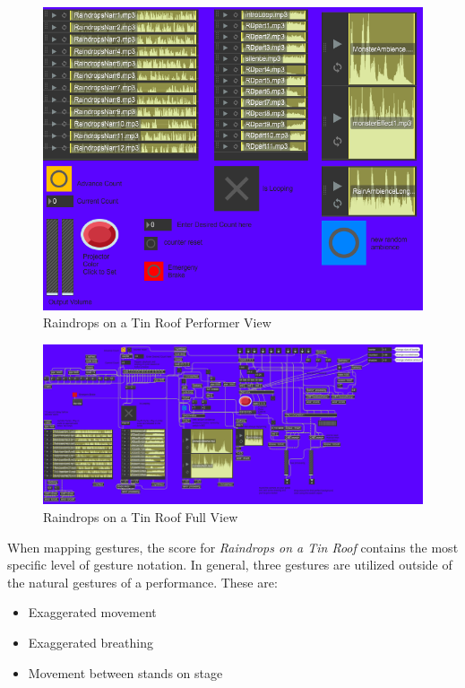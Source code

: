 \begin{figure}
    \centering
    \includegraphics{diagrams/maxPatches/raindropspres.png}
    \caption{Raindrops on a Tin Roof Performer View}
    \label{fig:raindropsPres}
\end{figure}

\begin{figure}
    \centering
    \includegraphics[scale=0.6]{diagrams/maxPatches/raindropsRaw.png}
    \caption{Raindrops on a Tin Roof Full View}
    \label{fig:raindropsRaw}
\end{figure}

When mapping gestures, the score for \textit{Raindrops on a Tin Roof} contains the most specific level of gesture notation. In general, three gestures are utilized outside of the natural gestures of a performance. These are: 

\begin{itemize}
    \item Exaggerated movement
    \item Exaggerated breathing
    \item Movement between stands on stage
\end{itemize}

